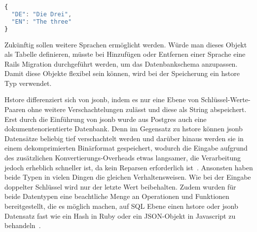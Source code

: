 \begin{lstlisting}[language=Javascript,float=h!,caption={Multilinguales Objekt}, label={fig:basics:jsonschema:4}]
{
  "DE": "Die Drei",
  "EN": "The three"
}
\end{lstlisting}

Zukünftig sollen weitere Sprachen ermöglicht werden. Würde man dieses Objekt als Tabelle definieren, müsste bei Hinzufügen oder Entfernen einer Sprache eine Rails Migration durchgeführt werden, um das Datenbankschema anzupassen. Damit diese Objekte flexibel sein können, wird bei der Speicherung ein hstore Typ verwendet.

Hstore differenziert sich von jsonb, indem es nur eine Ebene von Schlüssel-Werte-Paaren ohne weitere Verschachtelungen zulässt und diese als String abspeichert. Erst durch die Einführung von jsonb wurde aus Postgres auch eine dokumentenorientierte Datenbank.
Denn im Gegensatz zu hstore können jsonb Datensätze beliebig tief verschachtelt werden und
darüber hinaus werden sie in einem dekomprimierten Binärformat gespeichert, wodurch die Eingabe aufgrund des zusätzlichen Konvertierungs-Overheads etwas langsamer,
die Verarbeitung jedoch erheblich schneller ist, da kein Reparsen erforderlich ist~\cite{postgresql-json}.
Ansonsten haben beide Typen in vielen Dingen die gleichen Verhaltensweisen. Wie bei der Eingabe doppelter Schlüssel wird nur der letzte Wert beibehalten.
Zudem wurden für beide Datentypen eine beachtliche Menge an Operationen und Funktionen bereitgestellt, die es möglich machen,
auf SQL Ebene einen hstore oder jsonb Datensatz fast wie ein Hash in Ruby oder ein JSON-Objekt in Javascript zu behandeln~\cite{postgresql-hstore}.
